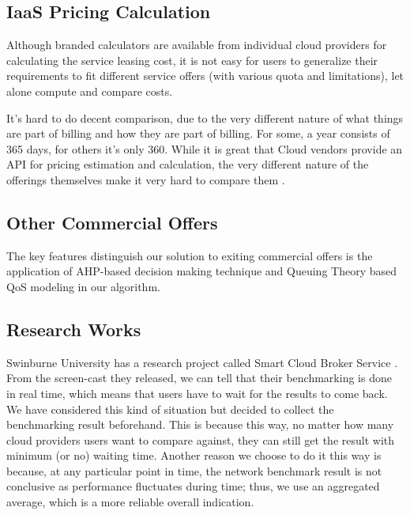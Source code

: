 \subsection{IaaS Pricing Calculation}

Although branded calculators are available from individual cloud providers
\cite{AWSCalculator, AzurePricingCalculator, GooglePricingCalculator, RackspaceCalculator, SoftLayerCalculator}
for calculating the service leasing cost, it is not easy for users to
generalize their requirements to fit different service offers (with
various quota and limitations), let alone compute and compare
costs. 

It's hard to do decent comparison, due to the very different nature of what things are part of billing and how they are part of billing. For some, a year consists of 365 days, for others it's only 360. While it is great that Cloud vendors provide an API for pricing estimation and calculation, the very different nature of the offerings themselves make it very hard to compare them \cite{Cloudorado}.

\subsection{Other Commercial Offers} 

The key features distinguish our solution to exiting commercial offers
\cite{BurstormRecommendation, CloudHarmonyProviderDirectory, RightscaleCloudPricingService, Cloudorado, CloudReviews} 
is the application of AHP-based decision making technique
and Queuing Theory based QoS modeling in our algorithm.

\subsection{Research Works}

Swinburne University has a research project called 
Smart Cloud Broker Service \cite{OpenMarketforTradingCloudServices}.
From the screen-cast they released, we can tell that their
benchmarking is done in real time, which means that users
have to wait for the results to come back. We have considered
this kind of situation but decided to collect the benchmarking
result beforehand. This is because this way, no matter how
many cloud providers users want to compare against, they can
still get the result with minimum (or no) waiting time. Another
reason we choose to do it this way is because, at any particular
point in time, the network benchmark result is not conclusive as
performance fluctuates during time; thus, we use an aggregated
average, which is a more reliable overall indication.

